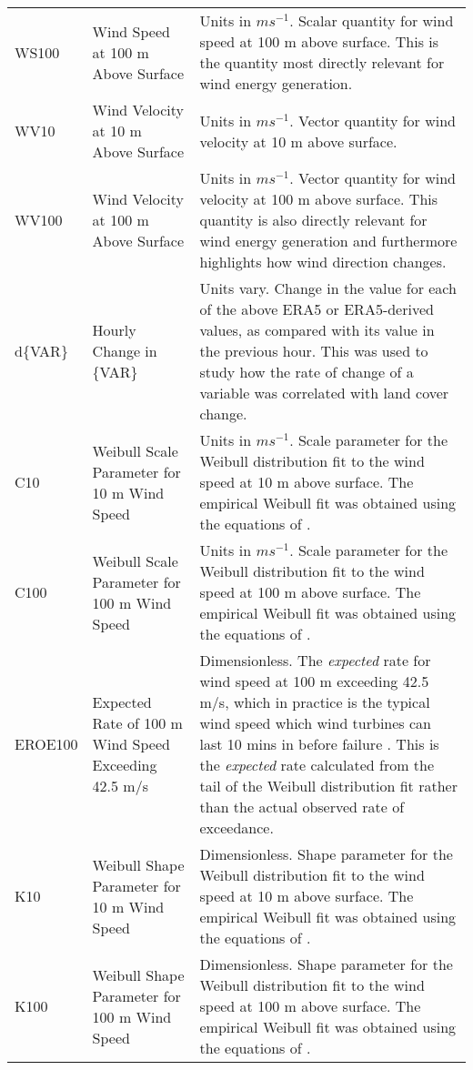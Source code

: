 \begin{landscape}
\begin{longtable}{P{2cm}P{3cm}P{15cm}}
		WS100 & Wind Speed at 100 m Above Surface & Units in $m s^{-1}$. Scalar quantity for wind speed at 100 m above surface. This is the quantity most directly relevant for wind energy generation. \\
		WV10 & Wind Velocity at 10 m Above Surface & Units in $m s^{-1}$. Vector quantity for wind velocity at 10 m above surface. \\
		WV100 & Wind Velocity at 100 m Above Surface & Units in $m s^{-1}$. Vector quantity for wind velocity at 100 m above surface. This quantity is also directly relevant for wind energy generation and furthermore highlights how wind direction changes. \\ \midrule
		d\{VAR\} & Hourly Change in \{VAR\} & Units vary. Change in the value for each of the above ERA5 or ERA5-derived values, as compared with its value in the previous hour. This was used to study how the rate of change of a variable was correlated with land cover change. \\ \midrule
		C10 & Weibull Scale Parameter for 10 m Wind Speed & Units in $m s^{-1}$. Scale parameter for the Weibull distribution fit to the wind speed at 10 m above surface. The empirical Weibull fit was obtained using the equations of \citep{justus1977}. \\
		C100 & Weibull Scale Parameter for 100 m Wind Speed & Units in $m s^{-1}$. Scale parameter for the Weibull distribution fit to the wind speed at 100 m above surface. The empirical Weibull fit was obtained using the equations of \citep{justus1977}. \\
		EROE100 & Expected Rate of 100 m Wind Speed Exceeding 42.5 m/s & Dimensionless. The \textit{expected} rate for wind speed at 100 m exceeding 42.5 m/s, which in practice is the typical wind speed which wind turbines can last 10 mins in before failure \citep{chen2015, chen2016, ge_web}. This is the \textit{expected} rate calculated from the tail of the Weibull distribution fit rather than the actual observed rate of exceedance. \\
		K10 & Weibull Shape Parameter for 10 m Wind Speed & Dimensionless. Shape parameter for the Weibull distribution fit to the wind speed at 10 m above surface. The empirical Weibull fit was obtained using the equations of \citep{justus1977}. \\
		K100 & Weibull Shape Parameter for 100 m Wind Speed & Dimensionless. Shape parameter for the Weibull distribution fit to the wind speed at 100 m above surface. The empirical Weibull fit was obtained using the equations of \citep{justus1977}. \\

\end{longtable}
\end{landscape}
